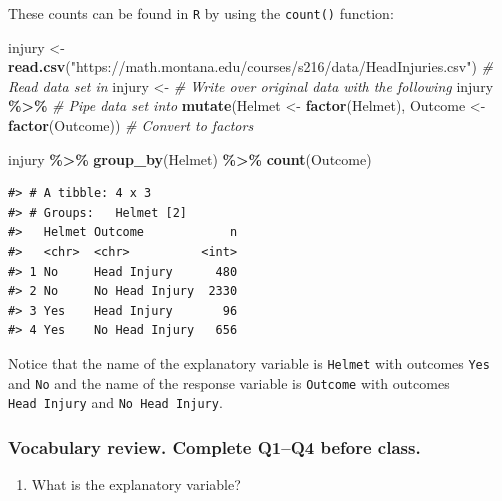 \documentclass[
]{report}
\newenvironment{Shaded}{\begin{snugshade}}{\end{snugshade}}
\newcommand{\CommentTok}[1]{\textcolor[rgb]{0.56,0.35,0.01}{\textit{#1}}}
\newcommand{\KeywordTok}[1]{\textcolor[rgb]{0.13,0.29,0.53}{\textbf{#1}}}
\newcommand{\NormalTok}[1]{#1}
\newcommand{\OperatorTok}[1]{\textcolor[rgb]{0.81,0.36,0.00}{\textbf{#1}}}
\newcommand{\StringTok}[1]{\textcolor[rgb]{0.31,0.60,0.02}{#1}}
\providecommand{\tightlist}{%
  \setlength{\itemsep}{0pt}\setlength{\parskip}{0pt}}
\begin{document}
These counts can be found in \texttt{R} by using the \texttt{count()} function:

\begin{Shaded}
\begin{Highlighting}[]
\NormalTok{injury \textless{}{-}}\StringTok{ }\KeywordTok{read.csv}\NormalTok{(}\StringTok{"https://math.montana.edu/courses/s216/data/HeadInjuries.csv"}\NormalTok{) }\CommentTok{\# Read data set in}
\NormalTok{injury \textless{}{-}}\StringTok{ }\CommentTok{\# Write over original data with the following}
\StringTok{  }\NormalTok{injury }\OperatorTok{\%\textgreater{}\%}\StringTok{ }\CommentTok{\# Pipe data set into}
\StringTok{  }\KeywordTok{mutate}\NormalTok{(Helmet \textless{}{-}}\StringTok{ }\KeywordTok{factor}\NormalTok{(Helmet),}
\NormalTok{         Outcome \textless{}{-}}\StringTok{ }\KeywordTok{factor}\NormalTok{(Outcome)) }\CommentTok{\# Convert to factors}

\NormalTok{injury }\OperatorTok{\%\textgreater{}\%}\StringTok{ }\KeywordTok{group\_by}\NormalTok{(Helmet) }\OperatorTok{\%\textgreater{}\%}\StringTok{ }\KeywordTok{count}\NormalTok{(Outcome)}
\end{Highlighting}
\end{Shaded}

\begin{verbatim}
#> # A tibble: 4 x 3
#> # Groups:   Helmet [2]
#>   Helmet Outcome            n
#>   <chr>  <chr>          <int>
#> 1 No     Head Injury      480
#> 2 No     No Head Injury  2330
#> 3 Yes    Head Injury       96
#> 4 Yes    No Head Injury   656
\end{verbatim}

Notice that the name of the explanatory variable is \texttt{Helmet} with outcomes \texttt{Yes} and \texttt{No} and the name of the response variable is \texttt{Outcome} with outcomes \texttt{Head\ Injury} and \texttt{No\ Head\ Injury}.

\hypertarget{vocabulary-review.-complete-q1q4-before-class.-1}{%
\subsubsection*{Vocabulary review. Complete Q1--Q4 before class.}\label{vocabulary-review.-complete-q1q4-before-class.-1}}

\begin{enumerate}
\def\labelenumi{\arabic{enumi}.}
\tightlist
\item
  What is the explanatory variable?
\end{enumerate}
\end{document}
